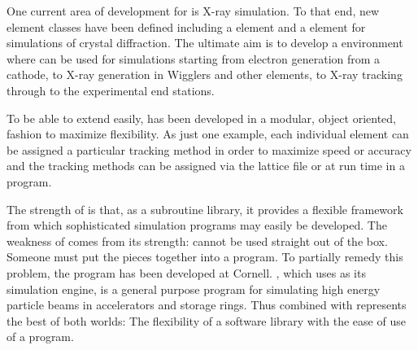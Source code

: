 One current area of development for \bmad is X-ray simulation. To that
end, new element classes have been defined including a 
element and a  element for simulations of crystal
diffraction. The ultimate aim is to develop a environment where \bmad
can be used for simulations starting from electron generation from a
cathode, to X-ray generation in Wigglers and other elements, to X-ray
tracking through to the experimental end stations.

To be able to extend \bmad easily, \bmad has been developed in a
modular, object oriented, fashion to maximize flexibility. As just one
example, each individual element can be assigned a particular tracking
method in order to maximize speed or accuracy and the tracking methods
can be assigned via the lattice file or at run time in a program.

The strength of \bmad is that, as a subroutine library, it provides a
flexible framework from which sophisticated simulation programs may
easily be developed.  The weakness of \bmad comes from its strength:
\bmad cannot be used straight out of the box. Someone must put the
pieces together into a program. To partially remedy this problem, the
\tao program\cite{b:tao} has been developed at Cornell. \tao, which uses
\bmad as its simulation engine, is a general purpose program for
simulating high energy particle beams in accelerators and storage rings.
Thus \bmad combined with \tao represents the best of both worlds: The
flexibility of a software library with the ease of use of a program.

\vfill
\break
